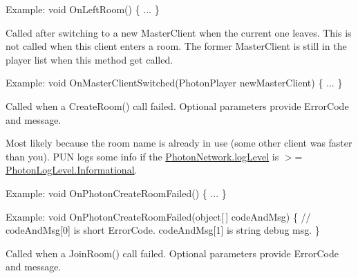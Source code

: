 \begin{Desc}
\begin{description}
Example\+: void On\+Left\+Room() \{ ... \} \item[{\em 
On\+Master\+Client\+Switched\hypertarget{group__public_api_ggaf30bbea51cc8c4b1ddc239d1c5c1468fadf130e855b7c27f0f10f66db4a7e83c4}{}\label{group__public_api_ggaf30bbea51cc8c4b1ddc239d1c5c1468fadf130e855b7c27f0f10f66db4a7e83c4}
}]Called after switching to a new Master\+Client when the current one leaves. This is not called when this client enters a room. The former Master\+Client is still in the player list when this method get called.

Example\+: void On\+Master\+Client\+Switched(\+Photon\+Player new\+Master\+Client) \{ ... \} \item[{\em 
On\+Photon\+Create\+Room\+Failed\hypertarget{group__public_api_ggaf30bbea51cc8c4b1ddc239d1c5c1468fab6273c525ff9cd304d2a8b0adb61a5ea}{}\label{group__public_api_ggaf30bbea51cc8c4b1ddc239d1c5c1468fab6273c525ff9cd304d2a8b0adb61a5ea}
}]Called when a Create\+Room() call failed. Optional parameters provide Error\+Code and message. 

Most likely because the room name is already in use (some other client was faster than you). P\+UN logs some info if the \hyperlink{class_photon_network_aa7c0c32ec0a25f37438436f10c5bde59}{Photon\+Network.\+log\+Level} is $>$= \hyperlink{group__public_api_ggaf0468f6a0c8ab8caec09678e6dc6f3d5a5391f9a882a54c787b206138ed6d28b0}{Photon\+Log\+Level.\+Informational}.

Example\+: void On\+Photon\+Create\+Room\+Failed() \{ ... \}

Example\+: void On\+Photon\+Create\+Room\+Failed(object\mbox{[}$\,$\mbox{]} code\+And\+Msg) \{ // code\+And\+Msg\mbox{[}0\mbox{]} is short Error\+Code. code\+And\+Msg\mbox{[}1\mbox{]} is string debug msg. \} \item[{\em 
On\+Photon\+Join\+Room\+Failed\hypertarget{group__public_api_ggaf30bbea51cc8c4b1ddc239d1c5c1468fa3ad62b9539e5cf97eacf06e2268dea5a}{}\label{group__public_api_ggaf30bbea51cc8c4b1ddc239d1c5c1468fa3ad62b9539e5cf97eacf06e2268dea5a}
}]Called when a Join\+Room() call failed. Optional parameters provide Error\+Code and message. 


\end{description}
\end{Desc}
